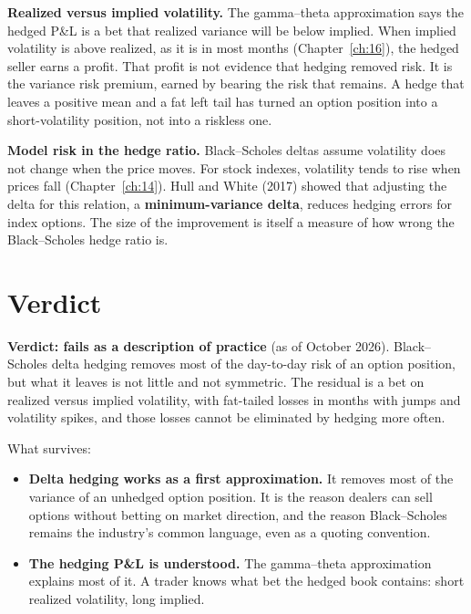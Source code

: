 \textbf{Realized versus implied volatility.} The gamma--theta approximation says the hedged P\&L is a bet that realized variance will be below implied. When implied volatility is above realized, as it is in most months (Chapter~\ref{ch:16}), the hedged seller earns a profit. That profit is not evidence that hedging removed risk. It is the variance risk premium, earned by bearing the risk that remains. A hedge that leaves a positive mean and a fat left tail has turned an option position into a short-volatility position, not into a riskless one.

\textbf{Model risk in the hedge ratio.} Black--Scholes deltas assume volatility does not change when the price moves. For stock indexes, volatility tends to rise when prices fall (Chapter~\ref{ch:14}). Hull and White (2017) showed that adjusting the delta for this relation, a \textbf{minimum-variance delta}, reduces hedging errors for index options. The size of the improvement is itself a measure of how wrong the Black--Scholes hedge ratio is.

\section{Verdict}
\label{sec:17-verdict}

\begin{callout}
\textbf{Verdict: fails as a description of practice} (as of October 2026). Black--Scholes delta hedging removes most of the day-to-day risk of an option position, but what it leaves is not little and not symmetric. The residual is a bet on realized versus implied volatility, with fat-tailed losses in months with jumps and volatility spikes, and those losses cannot be eliminated by hedging more often.
\end{callout}

What survives:

\begin{itemize}
  \item \textbf{Delta hedging works as a first approximation.} It removes most of the variance of an unhedged option position. It is the reason dealers can sell options without betting on market direction, and the reason Black--Scholes remains the industry's common language, even as a quoting convention.
  \item \textbf{The hedging P\&L is understood.} The gamma--theta approximation explains most of it. A trader knows what bet the hedged book contains: short realized volatility, long implied.
\end{itemize}


